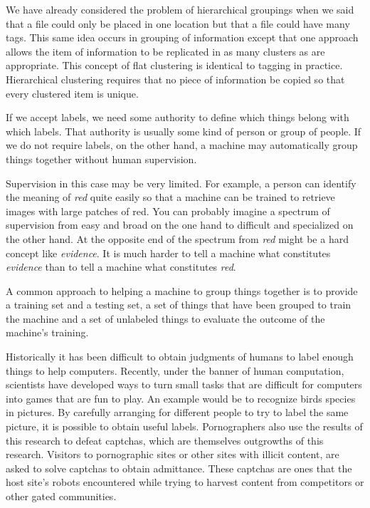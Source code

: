 \hypertarget{flat-and-hierarchical-grouping}{%
\label{flat-and-hierarchical-grouping}}

We have already considered the problem of hierarchical groupings when we
said that a file could only be placed in one location but that a file
could have many tags. This same idea occurs in grouping of information
except that one approach allows the item of information to be replicated
in as many clusters as are appropriate. This concept of flat clustering
is identical to tagging in practice. Hierarchical clustering requires
that no piece of information be copied so that every clustered item is
unique.

\hypertarget{automatic-and-supervised-grouping}{%
\label{automatic-and-supervised-grouping}}

If we accept labels, we need some authority to define which things
belong with which labels. That authority is usually some kind of person
or group of people. If we do not require labels, on the other hand, a
machine may automatically group things together without human
supervision.

Supervision in this case may be very limited. For example, a person can
identify the meaning of \emph{red} quite easily so that a machine can be
trained to retrieve images with large patches of red. You can probably
imagine a spectrum of supervision from easy and broad on the one hand to
difficult and specialized on the other hand. At the opposite end of the
spectrum from \emph{red} might be a hard concept like \emph{evidence}.
It is much harder to tell a machine what constitutes \emph{evidence}
than to tell a machine what constitutes \emph{red}.

A common approach to helping a machine to group things together is to
provide a training set and a testing set, a set of things that have been
grouped to train the machine and a set of unlabeled things to evaluate
the outcome of the machine's training.

\hypertarget{human-computation}{%
\label{human-computation}}

Historically it has been difficult to obtain judgments of humans to
label enough things to help computers. Recently, under the banner of
human computation, scientists have developed ways to turn small tasks
that are difficult for computers into games that are fun to play. An
example would be to recognize birds species in pictures. By carefully
arranging for different people to try to label the same picture, it is
possible to obtain useful labels. Pornographers also use the results of
this research to defeat captchas, which are themselves outgrowths of
this research. Visitors to pornographic sites or other sites with
illicit content, are asked to solve captchas to obtain admittance. These
captchas are ones that the host site's robots encountered while trying
to harvest content from competitors or other gated communities.

